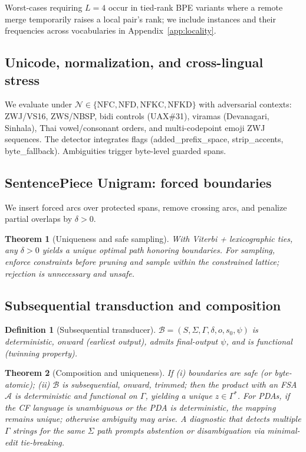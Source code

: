 \documentclass{article}
\newtheorem{definition}{Definition}
\newtheorem{theorem}{Theorem}
\begin{document}
Worst-cases requiring $L=4$ occur in tied-rank BPE variants where a remote merge temporarily raises a local pair’s rank; we include instances and their frequencies across vocabularies in Appendix~\ref{app:locality}.

\subsection{Unicode, normalization, and cross-lingual stress}
We evaluate under $\mathcal{N}\in\{\mathrm{NFC,NFD,NFKC,NFKD}\}$ with adversarial contexts: ZWJ/VS16, ZWS/NBSP, bidi controls (UAX\#31), viramas (Devanagari, Sinhala), Thai vowel/consonant orders, and multi-codepoint emoji ZWJ sequences. The detector integrates flags (added\_prefix\_space, strip\_accents, byte\_fallback). Ambiguities trigger byte-level guarded spans.

\subsection{SentencePiece Unigram: forced boundaries}
We insert forced arcs over protected spans, remove crossing arcs, and penalize partial overlaps by $\delta>0$.
\begin{theorem}[Uniqueness and safe sampling]\label{thm:uni}
With Viterbi + lexicographic ties, any $\delta>0$ yields a unique optimal path honoring boundaries. For sampling, enforce constraints before pruning and sample within the constrained lattice; rejection is unnecessary and unsafe.
\end{theorem}

\subsection{Subsequential transduction and composition}\label{sec:transducer}
\begin{definition}[Subsequential transducer]
$\mathcal{B}=(S,\Sigma,\Gamma,\delta,o,s_0,\psi)$ is deterministic, onward (earliest output), admits final-output $\psi$, and is functional (twinning property).
\end{definition}

\begin{theorem}[Composition and uniqueness]\label{thm:comp}
If (i) boundaries are safe (or byte-atomic); (ii) $\mathcal{B}$ is subsequential, onward, trimmed; then the product with an FSA $\mathcal{A}$ is deterministic and functional on $\Gamma$, yielding a unique $z\in\Gamma^\ast$. For PDAs, if the CF language is unambiguous or the PDA is deterministic, the mapping remains unique; otherwise ambiguity may arise. A diagnostic that detects multiple $\Gamma$ strings for the same $\Sigma$ path prompts abstention or disambiguation via minimal-edit tie-breaking.
\end{theorem}
\end{document}
